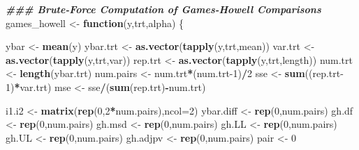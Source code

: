 \documentclass[
]{book}
\newenvironment{Shaded}{\begin{snugshade}}{\end{snugshade}}
\newcommand{\AttributeTok}[1]{\textcolor[rgb]{0.13,0.29,0.53}{#1}}
\newcommand{\ControlFlowTok}[1]{\textcolor[rgb]{0.13,0.29,0.53}{\textbf{#1}}}
\newcommand{\DecValTok}[1]{\textcolor[rgb]{0.00,0.00,0.81}{#1}}
\newcommand{\DocumentationTok}[1]{\textcolor[rgb]{0.56,0.35,0.01}{\textbf{\textit{#1}}}}
\newcommand{\FunctionTok}[1]{\textcolor[rgb]{0.13,0.29,0.53}{\textbf{#1}}}
\newcommand{\NormalTok}[1]{#1}
\newcommand{\OtherTok}[1]{\textcolor[rgb]{0.56,0.35,0.01}{#1}}
\newcommand{\SpecialCharTok}[1]{\textcolor[rgb]{0.81,0.36,0.00}{\textbf{#1}}}
\begin{document}
\begin{Shaded}
\begin{Highlighting}[]
\DocumentationTok{\#\#\# Brute{-}Force Computation of Games{-}Howell Comparisons}
\NormalTok{games\_howell }\OtherTok{\textless{}{-}} \ControlFlowTok{function}\NormalTok{(y,trt,alpha) \{}

\NormalTok{ybar }\OtherTok{\textless{}{-}} \FunctionTok{mean}\NormalTok{(y)}
\NormalTok{ybar.trt }\OtherTok{\textless{}{-}} \FunctionTok{as.vector}\NormalTok{(}\FunctionTok{tapply}\NormalTok{(y,trt,mean))}
\NormalTok{var.trt }\OtherTok{\textless{}{-}} \FunctionTok{as.vector}\NormalTok{(}\FunctionTok{tapply}\NormalTok{(y,trt,var))}
\NormalTok{rep.trt }\OtherTok{\textless{}{-}} \FunctionTok{as.vector}\NormalTok{(}\FunctionTok{tapply}\NormalTok{(y,trt,length))}
\NormalTok{num.trt }\OtherTok{\textless{}{-}} \FunctionTok{length}\NormalTok{(ybar.trt)}
\NormalTok{num.pairs }\OtherTok{\textless{}{-}}\NormalTok{ num.trt}\SpecialCharTok{*}\NormalTok{(num.trt}\DecValTok{{-}1}\NormalTok{)}\SpecialCharTok{/}\DecValTok{2}
\NormalTok{sse }\OtherTok{\textless{}{-}} \FunctionTok{sum}\NormalTok{((rep.trt}\DecValTok{{-}1}\NormalTok{)}\SpecialCharTok{*}\NormalTok{var.trt)}
\NormalTok{mse }\OtherTok{\textless{}{-}}\NormalTok{ sse}\SpecialCharTok{/}\NormalTok{(}\FunctionTok{sum}\NormalTok{(rep.trt)}\SpecialCharTok{{-}}\NormalTok{num.trt)}

\NormalTok{i1.i2 }\OtherTok{\textless{}{-}} \FunctionTok{matrix}\NormalTok{(}\FunctionTok{rep}\NormalTok{(}\DecValTok{0}\NormalTok{,}\DecValTok{2}\SpecialCharTok{*}\NormalTok{num.pairs),}\AttributeTok{ncol=}\DecValTok{2}\NormalTok{)}
\NormalTok{ybar.diff }\OtherTok{\textless{}{-}} \FunctionTok{rep}\NormalTok{(}\DecValTok{0}\NormalTok{,num.pairs)}
\NormalTok{gh.df }\OtherTok{\textless{}{-}} \FunctionTok{rep}\NormalTok{(}\DecValTok{0}\NormalTok{,num.pairs)}
\NormalTok{gh.msd }\OtherTok{\textless{}{-}} \FunctionTok{rep}\NormalTok{(}\DecValTok{0}\NormalTok{,num.pairs)}
\NormalTok{gh.LL }\OtherTok{\textless{}{-}} \FunctionTok{rep}\NormalTok{(}\DecValTok{0}\NormalTok{,num.pairs)}
\NormalTok{gh.UL }\OtherTok{\textless{}{-}} \FunctionTok{rep}\NormalTok{(}\DecValTok{0}\NormalTok{,num.pairs)}
\NormalTok{gh.adjpv }\OtherTok{\textless{}{-}} \FunctionTok{rep}\NormalTok{(}\DecValTok{0}\NormalTok{,num.pairs)}
\NormalTok{pair }\OtherTok{\textless{}{-}} \DecValTok{0}


\end{Highlighting}
\end{Shaded}
\end{document}
